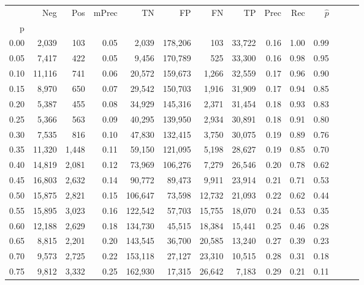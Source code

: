 \begin{tabular}{rrrrrrrrrrrrrr}
\toprule
{} &     Neg &    Pos & mPrec &       TN &       FP &      FN &      TP &  Prec &   Rec & $\hat{p}$ \\
p    &         &        &       &          &          &         &         &       &       &           \\
\midrule
0.00 &   2,039 &    103 &  0.05 &    2,039 &  178,206 &     103 &  33,722 &  0.16 &  1.00 &      0.99 \\
0.05 &   7,417 &    422 &  0.05 &    9,456 &  170,789 &     525 &  33,300 &  0.16 &  0.98 &      0.95 \\
0.10 &  11,116 &    741 &  0.06 &   20,572 &  159,673 &   1,266 &  32,559 &  0.17 &  0.96 &      0.90 \\
0.15 &   8,970 &    650 &  0.07 &   29,542 &  150,703 &   1,916 &  31,909 &  0.17 &  0.94 &      0.85 \\
0.20 &   5,387 &    455 &  0.08 &   34,929 &  145,316 &   2,371 &  31,454 &  0.18 &  0.93 &      0.83 \\
0.25 &   5,366 &    563 &  0.09 &   40,295 &  139,950 &   2,934 &  30,891 &  0.18 &  0.91 &      0.80 \\
0.30 &   7,535 &    816 &  0.10 &   47,830 &  132,415 &   3,750 &  30,075 &  0.19 &  0.89 &      0.76 \\
0.35 &  11,320 &  1,448 &  0.11 &   59,150 &  121,095 &   5,198 &  28,627 &  0.19 &  0.85 &      0.70 \\
0.40 &  14,819 &  2,081 &  0.12 &   73,969 &  106,276 &   7,279 &  26,546 &  0.20 &  0.78 &      0.62 \\
0.45 &  16,803 &  2,632 &  0.14 &   90,772 &   89,473 &   9,911 &  23,914 &  0.21 &  0.71 &      0.53 \\
0.50 &  15,875 &  2,821 &  0.15 &  106,647 &   73,598 &  12,732 &  21,093 &  0.22 &  0.62 &      0.44 \\
0.55 &  15,895 &  3,023 &  0.16 &  122,542 &   57,703 &  15,755 &  18,070 &  0.24 &  0.53 &      0.35 \\
0.60 &  12,188 &  2,629 &  0.18 &  134,730 &   45,515 &  18,384 &  15,441 &  0.25 &  0.46 &      0.28 \\
0.65 &   8,815 &  2,201 &  0.20 &  143,545 &   36,700 &  20,585 &  13,240 &  0.27 &  0.39 &      0.23 \\
0.70 &   9,573 &  2,725 &  0.22 &  153,118 &   27,127 &  23,310 &  10,515 &  0.28 &  0.31 &      0.18 \\
0.75 &   9,812 &  3,332 &  0.25 &  162,930 &   17,315 &  26,642 &   7,183 &  0.29 &  0.21 &      0.11 \\

\end{tabular}
